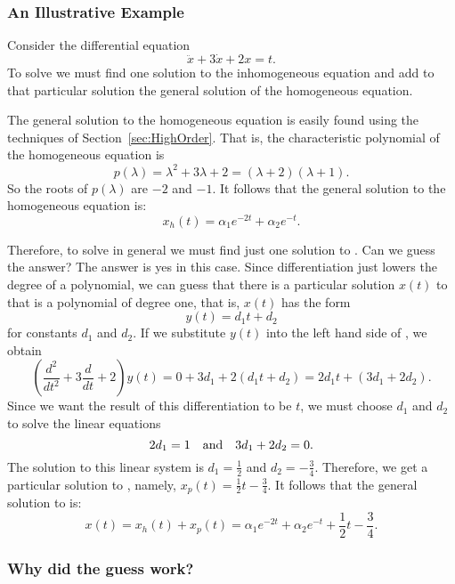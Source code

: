 \subsubsection*{An Illustrative Example}

Consider the differential equation
\begin{equation}  \label{eq:undetcoeffex}
\ddot{x} + 3\dot{x}+2x = t.
\end{equation}
To solve  we must find one solution to the inhomogeneous
equation and add to that particular solution the 
general solution of the 
homogeneous equation.  

The general solution to the homogeneous equation is easily found using the
techniques of Section~\ref{sec:HighOrder}.  That is, the characteristic 
polynomial of the homogeneous equation is 
\[
p(\lambda) = \lambda^2 + 3\lambda + 2 = (\lambda+2)(\lambda+1).
\]
So the roots of $p(\lambda)$ are $-2$ and $-1$.  It follows that the general
solution to the homogeneous equation is:
\[
x_h(t)= \alpha_1e^{-2t} + \alpha_2e^{-t}.
\]

Therefore, to solve  in general we must find just one 
solution to .  Can we guess the answer?  The answer is
yes in this case.  Since differentiation just lowers the degree of a 
polynomial, we can guess that there is a particular solution $x(t)$ to 
 that is a polynomial of degree one, that is, $x(t)$ 
has the form 
\[
y(t)=d_1t+d_2
\]
for constants $d_1$ and $d_2$.  If we substitute $y(t)$ 
into the left hand side of , we obtain
\[
\left(\frac{d^2}{dt^2}+3\frac{d}{dt}+2\right)y(t) = 
0+3d_1+2(d_1t+d_2) = 2d_1t + (3d_1+2d_2).
\]
Since we want the result of this differentiation to be $t$, we must choose 
$d_1$ and $d_2$ to solve the linear equations
\[
2d_1 = 1 \quad\mbox{and}\quad 3d_1+2d_2=0.
\]
The solution to this linear system is $d_1=\frac{1}{2}$ and 
$d_2=-\frac{3}{4}$.   Therefore, we get a 
particular solution to 
, namely, $x_p(t)=\frac{1}{2}t-\frac{3}{4}$.  
It follows that the general solution to  is:
\[
x(t) = x_h(t)+x_p(t) = \alpha_1e^{-2t} + \alpha_2e^{-t} + 
\frac{1}{2}t-\frac{3}{4}.
\]

\subsubsection*{Why did the guess work?}

